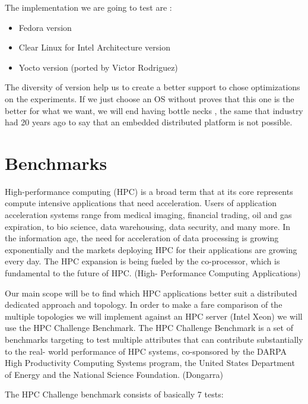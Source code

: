 The implementation we are going to test are : 

\begin{itemize}
    \item Fedora version
    \item Clear Linux for Intel Architecture version
    \item Yocto version (ported by Victor Rodriguez)
\end{itemize}

The diversity of version help us to create a better support to chose
optimizations on the experiments. If we just choose an OS without proves that
this one is the better for what we want, we will end having bottle necks , the
same that industry had 20 years ago to say that an embedded distributed
platform is not possible.


\section{Benchmarks}
\noindent


High-performance computing (HPC) is a broad term that at its core represents
compute intensive applications that need acceleration. Users of application
acceleration systems range from medical imaging, financial trading, oil and gas
expiration, to bio science, data warehousing, data security, and many more. In
the information age, the need for acceleration of data processing is growing
exponentially and the markets deploying HPC for their applications are growing
every day. The HPC expansion is being fueled by the co-processor, which is
fundamental to the future of HPC. (High- Performance Computing Applications)

Our main scope will be to find which HPC applications better suit a distributed
dedicated approach and topology.
In order to make a fare comparison of the multiple topologies we will implement
against an HPC server (Intel Xeon) we will use the HPC Challenge Benchmark. The
HPC Challenge Benchmark is a set of benchmarks targeting to test multiple
attributes that can contribute substantially to the real- world performance of
HPC systems, co-sponsored by the DARPA High Productivity Computing Systems
program, the United States Department of Energy and the National Science
Foundation. (Dongarra)

The HPC Challenge benchmark consists of basically 7 tests:


